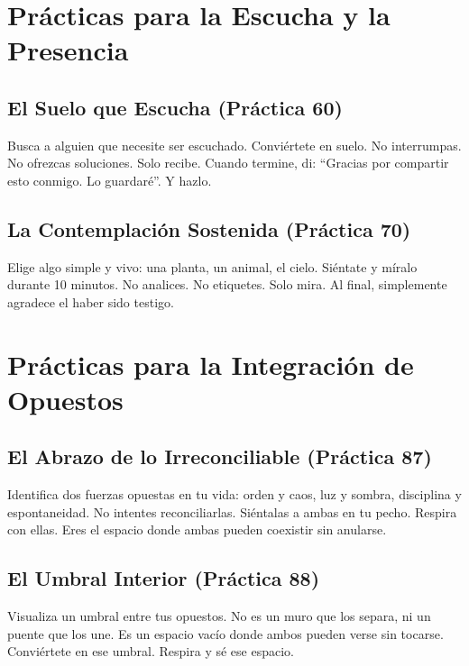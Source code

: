 \documentclass[12pt,openany]{book}
\begin{document}
\chapter{Prácticas para la Escucha y la Presencia}

\section{El Suelo que Escucha (Práctica 60)}
\begin{practica}
Busca a alguien que necesite ser escuchado. Conviértete en suelo. No
interrumpas. No ofrezcas soluciones. Solo recibe. Cuando termine, di:
``Gracias por compartir esto conmigo. Lo guardaré''. Y hazlo.
\end{practica}

\section{La Contemplación Sostenida (Práctica 70)}
\begin{practica}
Elige algo simple y vivo: una planta, un animal, el cielo. Siéntate y
míralo durante 10 minutos. No analices. No etiquetes. Solo mira. Al
final, simplemente agradece el haber sido testigo.
\end{practica}

\chapter{Prácticas para la Integración de Opuestos}

\section{El Abrazo de lo Irreconciliable (Práctica 87)}
\begin{practica}
Identifica dos fuerzas opuestas en tu vida: orden y caos, luz y sombra,
disciplina y espontaneidad. No intentes reconciliarlas. Siéntalas a
ambas en tu pecho. Respira con ellas. Eres el espacio donde ambas pueden
coexistir sin anularse.
\end{practica}

\section{El Umbral Interior (Práctica 88)}
\begin{practica}
Visualiza un umbral entre tus opuestos. No es un muro que los separa,
ni un puente que los une. Es un espacio vacío donde ambos pueden verse
sin tocarse. Conviértete en ese umbral. Respira y sé ese espacio.
\end{practica}
\end{document}
